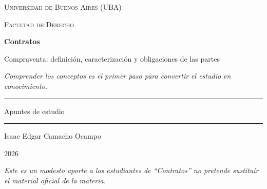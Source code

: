 \documentclass[12pt,oneside]{book}
\newcommand{\universidad}{Universidad de Buenos Aires (UBA)}
\newcommand{\facultad}{Facultad de Derecho}
\newcommand{\materia}{Contratos}
\newcommand{\titulo}{Compraventa: definición, caracterización y obligaciones de las partes}
\newcommand{\autor}{Isaac Edgar Camacho Ocampo}
\newcommand{\anio}{2026}
\begin{document}

\begin{titlepage}

\thispagestyle{empty}

\begin{center}

\vspace*{1cm}

{\large \textsc{\universidad}}

\vspace{0.2cm}

{\large \textsc{\facultad}}

\vspace{3cm}

{\Huge \textbf{\materia}}

\vspace{1cm}

{\LARGE \titulo}

\vspace{0.8cm}

\textit{Comprender los conceptos es el primer paso para convertir el estudio en conocimiento.}

\vspace{1.2cm}

\rule{0.70\textwidth}{0.5pt}

\vspace{0.5cm}

{\large Apuntes de estudio}

\vspace{0.5cm}

\rule{0.70\textwidth}{0.5pt}

\vfill

{\large \autor}

\vspace{0.3cm}

{\large \anio}

\end{center}

\vfill

\begin{flushleft}
\textit{Este es un modesto aporte a los estudiantes de ``Contratos'' no pretende sustituir el material oficial de la materia.}
\end{flushleft}

\end{titlepage}
\end{document}
